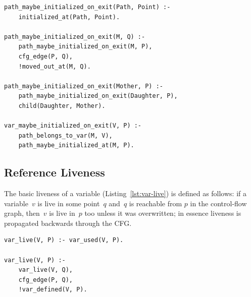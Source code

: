 \documentclass[11pt,a4paper,twoside,openany]{report}
\newenvironment{sourcecode}{\captionsetup{type=listing}}{}
\begin{document}
\begin{sourcecode}
  \label{lst:var-initialised}
\begin{verbatim}
path_maybe_initialized_on_exit(Path, Point) :- 
    initialized_at(Path, Point).

path_maybe_initialized_on_exit(M, Q) :-
    path_maybe_initialized_on_exit(M, P),
    cfg_edge(P, Q),
    !moved_out_at(M, Q).

path_maybe_initialized_on_exit(Mother, P) :-
    path_maybe_initialized_on_exit(Daughter, P),
    child(Daughter, Mother).

var_maybe_initialized_on_exit(V, P) :-
    path_belongs_to_var(M, V),
    path_maybe_initialized_at(M, P).
\end{verbatim}
\end{sourcecode}

\subsection{Reference Liveness}
\label{sec:var-livenes}

The basic liveness of a variable (Listing~\ref{lst:var-live}) is defined as
follows: if a variable~$v$ is live in some point~$q$ and~$q$ is reachable from
$p$ in the control-flow graph, then~$v$ is live in~$p$ too unless it was
overwritten; in essence liveness is propagated backwards through the CFG.

\begin{sourcecode}
  \label{lst:var-live}
\begin{verbatim}
var_live(V, P) :- var_used(V, P).

var_live(V, P) :-
    var_live(V, Q),
    cfg_edge(P, Q),
    !var_defined(V, P).
\end{verbatim}
\end{sourcecode}
\end{document}

